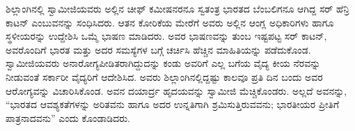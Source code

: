 ಶಿಲ್ಲಾಂಗಿನಲ್ಲಿ ಸ್ವಾಮೀಜಿಯವರು ಅಲ್ಲಿನ ಚೀಫ್ ಕಮೀಷನರನೂ ಸ್ವತಂತ್ರ ಭಾರತದ ಬೆಂಬಲಿಗನೂ ಆಗಿದ್ದ ಸರ್ ಹೆನ್ರಿ ಕಾಟನ್ ಎಂಬುವನನ್ನು ಸಂಧಿಸಿದರು. ಆತನ ಕೋರಿಕೆಯ ಮೇರೆಗೆ ಅವರು ಅಲ್ಲಿನ ಆಂಗ್ಲ ಅಧಿಕಾರಿಗಳು ಹಾಗೂ ಸ್ಥಳೀಯರನ್ನು ಉದ್ದೇಶಿಸಿ ಒಮ್ಮೆ ಭಾಷಣ ಮಾಡಿದರು. ಅವರ ಭಾಷಣವನ್ನು ತುಂಬ ಇಷ್ಟಪಟ್ಟ ಸರ್ ಕಾಟನ್, ಅವರೊಂದಿಗೆ ಭಾರತ ಮತ್ತು ಅದರ ಸಮಸ್ಯೆಗಳ ಬಗ್ಗೆ ಚರ್ಚಿಸಿ ಹೆಚ್ಚಿನ ಮಾಹಿತಿಯನ್ನು ಪಡೆದುಕೊಂಡ. ಸ್ವಾಮೀಜಿಯವರು ಅನಾರೋಗ್ಯಪೀಡಿತರಾಗಿದ್ದುದನ್ನು ಕಂಡು ಅವರಿಗೆ ಎಲ್ಲ ಬಗೆಯ ವೈದ್ಯ ಕೀಯ ನೆರವನ್ನು ನೀಡುವಂತೆ ಸರ್ಕಾರೀ ವೈದ್ಯರಿಗೆ ಆದೇಶಿಸಿದ. ಅವರು ಶಿಲ್ಲಾಂಗಿನಲ್ಲಿದ್ದಷ್ಟು ಕಾಲವೂ ಪ್ರತಿ ದಿನ ಬಂದು ಅವರ ಆರೋಗ್ಯವನ್ನು ವಿಚಾರಿಸಿಕೊಂಡ. ಅವನ ದಯಾರ್ದ್ರ ಹೃದಯವನ್ನು ಸ್ವಾಮೀಜಿ ಮೆಚ್ಚಿಕೊಂಡರು. ಅಲ್ಲದೆ ಅವನನ್ನು, “ಭಾರತದ ಆವಶ್ಯಕತೆಗಳನ್ನು ಅರಿತವನು ಹಾಗೂ ಅದರ ಉನ್ನತಿಗಾಗಿ ಶ್ರಮಿಸುತ್ತಿರುವವನು; ಭಾರತೀಯರ ಪ್ರೀತಿಗೆ ಪಾತ್ರನಾದವನು” ಎಂದು ಕೊಂಡಾಡಿದರು.

